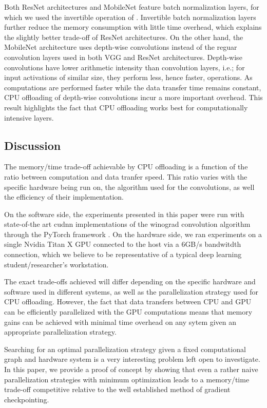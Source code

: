 \documentclass[11pt,onecolumn]{article}
\begin{document}
Both ResNet architectures and MobileNet \cite{howard2017mobilenets} feature batch normalization layers, 
for which we used the invertible operation of \cite{rota2018place}. 
Invertible batch normalization layers further reduce the memory consumption 
with little time overhead, which explains the slightly better trade-off of ResNet architectures.
On the other hand, the MobileNet architecture uses depth-wise convolutions instead of the 
reguar convolution layers used in both VGG and ResNet architectures.
Depth-wise convolutions have lower arithmetic intensity \cite{wu2018shift} than convolution layers,
i.e.; for input activations of similar size, they perform less, hence faster, operations. 
As computations are performed faster while the data transfer time remains constant,
CPU offloading of depth-wise convolutions incur a more important overhead.
This result highlights the fact that CPU offloading works best for computationally
intensive layers.

\subsection{Discussion}

The memory/time trade-off achievable by CPU offloading is a function of the ratio 
between computation and data tranfer speed. 
This ratio varies with the specific hardware
being run on, the algorithm used for the convolutions, 
as well the efficiency of their implementation.

On the software side, the experiments presented in this paper were run 
with state-of-the art cudnn implementations of the winograd convolution 
algorithm through the PyTorch framework \cite{paszke2017automatic}.
On the hardware side, we ran experiments on a single 
Nvidia Titan X GPU connected to the host via a 6GB/s bandwitdth connection, 
which we believe to be representative of a typical deep learning student/researcher's workstation.

The exact trade-offs achieved will differ depending on the specific hardware and software used in 
different systems, as well as the parallelization strategy used for CPU offloading. 
However, the fact that data transfers between CPU and GPU can be efficiently parallelized with the GPU computations
means that memory gains can be achieved with minimal time overhead 
on any sytem given an appropriate parallelization strategy.  

Searching for an optimal parallelization strategy given a fixed computational graph and hardware system
is a very interesting problem left open to investigate. 
In this paper, we provide a proof of concept by showing that 
even a rather naive parallelization strategies with minimum optimization
leads to a memory/time trade-off competitive relative to 
the well established method of gradient checkpointing.
\end{document}
